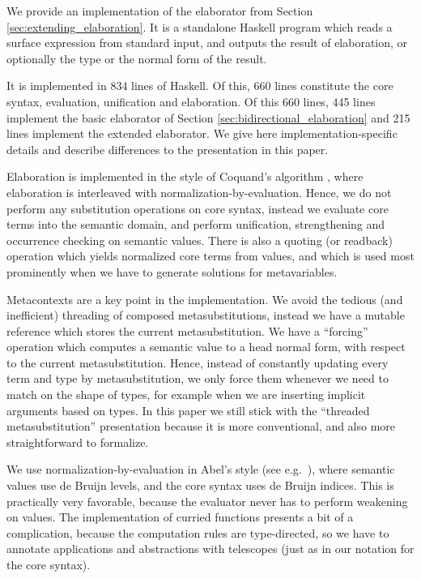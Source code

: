 \documentclass[acmsmall,review,anonymous,prologue,dvipsnames]{acmart}\settopmatter{printfolios=true,printccs=false,printacmref=false}
\theoremstyle{remark}
\begin{document}
We provide an implementation of the elaborator from Section
\ref{sec:extending_elaboration}. It is a standalone Haskell program which reads
a surface expression from standard input, and outputs the result of elaboration,
or optionally the type or the normal form of the result.

It is implemented in 834 lines of Haskell. Of this, 660 lines constitute the
core syntax, evaluation, unification and elaboration. Of this 660 lines, 445
lines implement the basic elaborator of Section
\ref{sec:bidirectional_elaboration} and 215 lines implement the extended
elaborator. We give here implementation-specific details and describe
differences to the presentation in this paper.

Elaboration is implemented in the style of Coquand's algorithm
\cite{coquand1996algorithm}, where elaboration is interleaved with
normalization-by-evaluation. Hence, we do not perform any substitution
operations on core syntax, instead we evaluate core terms into the semantic
domain, and perform unification, strengthening and occurrence checking on
semantic values. There is also a quoting (or readback) operation which yields
normalized core terms from values, and which is used most prominently when we
have to generate solutions for metavariables.

Metacontexts are a key point in the implementation. We avoid the tedious (and
inefficient) threading of composed metasubstitutions, instead we have a mutable
reference which stores the current metasubstitution. We have a ``forcing''
operation which computes a semantic value to a head normal form, with respect to
the current metasubstitution. Hence, instead of constantly updating every term
and type by metasubstitution, we only force them whenever we need to match on
the shape of types, for example when we are inserting implicit arguments based
on types. In this paper we still stick with the ``threaded metasubstitution''
presentation because it is more conventional, and also more straightforward to
formalize.

We use normalization-by-evaluation in Abel's style (see
e.g.\ \cite[Chapter~3]{abel2013normalization}), where semantic values use de
Bruijn levels, and the core syntax uses de Bruijn indices. This is practically
very favorable, because the evaluator never has to perform weakening on values.
The implementation of curried functions presents a bit of a complication,
because the computation rules are type-directed, so we have to annotate
applications and abstractions with telescopes (just as in our notation for the
core syntax).
\end{document}
